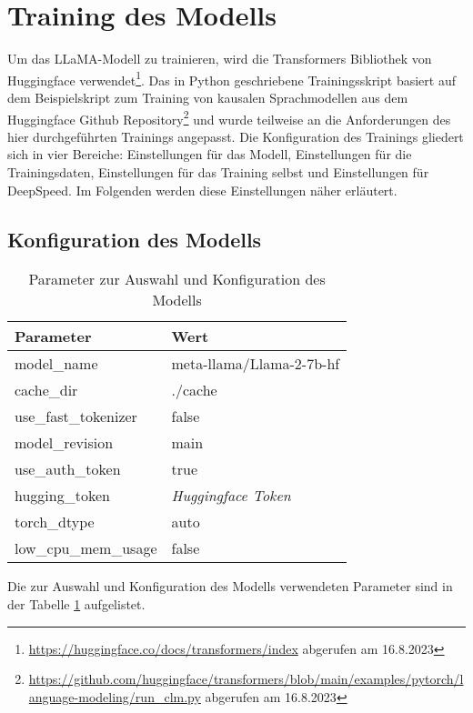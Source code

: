 \section{Training des Modells}
Um das LLaMA-Modell zu trainieren, wird die Transformers Bibliothek von Huggingface verwendet\footnote{\url{https://huggingface.co/docs/transformers/index} abgerufen am 16.8.2023}.
Das in Python geschriebene Trainingsskript basiert auf dem Beispielskript zum Training von kausalen Sprachmodellen aus dem Huggingface Github Repository\footnote{\url{https://github.com/huggingface/transformers/blob/main/examples/pytorch/language-modeling/run_clm.py} abgerufen am 16.8.2023} und wurde teilweise an die Anforderungen des hier durchgeführten Trainings angepasst.
Die Konfiguration des Trainings gliedert sich in vier Bereiche: Einstellungen für das Modell, Einstellungen für die Trainingsdaten, Einstellungen für das Training selbst und Einstellungen für DeepSpeed.
Im Folgenden werden diese Einstellungen näher erläutert.
\subsection{Konfiguration des Modells}
\begin{table}
    \centering
    \begin{tabular}{ll}
        \toprule
        \textbf{Parameter} & \textbf{Wert} \\
        \midrule
        model\_name & meta-llama/Llama-2-7b-hf \\
        cache\_dir & ./cache \\
        use\_fast\_tokenizer & false \\
        model\_revision & main \\
        use\_auth\_token & true \\
        hugging\_token & \textit{Huggingface Token} \\
        torch\_dtype & auto \\
        low\_cpu\_mem\_usage & false \\
    \end{tabular}
    \caption{Parameter zur Auswahl und Konfiguration des Modells}\label{tab:model-config}
\end{table}
Die zur Auswahl und Konfiguration des Modells verwendeten Parameter sind in der Tabelle \ref{tab:model-config} aufgelistet.\\

